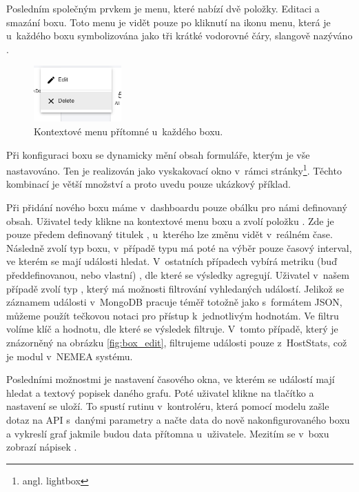Posledním společným prvkem je menu, které nabízí dvě položky. Editaci a smazání boxu. Toto menu je vidět pouze po kliknutí na ikonu menu, která je u~každého boxu symbolizována jako tři krátké vodorovné čáry, slangově nazýváno .

\begin{figure}[ht]
    \centering
    \includegraphics[width=0.3\textwidth]{fig/box_menu.png}
    \caption{Kontextové menu přítomné u~každého boxu.} \label{fig:box_menu}
\end{figure}

Při konfiguraci boxu se dynamicky mění obsah formuláře, kterým je vše nastavováno. Ten je realizován jako vyskakovací okno v~rámci stránky\footnote{angl. lightbox}. Těchto kombinací je větší množství a proto uvedu pouze ukázkový příklad.

Při přidání nového boxu máme v~dashboardu pouze obálku pro námi definovaný obsah. Uživatel tedy klikne na kontextové menu boxu a zvolí položku . Zde je pouze předem definovaný titulek , u~kterého lze změnu vidět v~reálném čase. Následně zvolí typ boxu, v~případě typu  má poté na výběr pouze časový interval, ve kterém se mají události hledat. V~ostatních případech vybírá metriku (buď předdefinovanou, nebo vlastní) , dle které se výsledky agregují. Uživatel v~našem případě zvolí typ , který má možnosti filtrování vyhledaných událostí. Jelikož se záznamem události v~MongoDB pracuje téměř totožně jako s~formátem JSON, můžeme použít tečkovou notaci pro přístup k~jednotlivým hodnotám. Ve filtru volíme klíč a hodnotu, dle které se výsledek filtruje. V~tomto případě, který je znázorněný na obrázku \ref{fig:box_edit}, filtrujeme události pouze z~HostStats, což je modul v~NEMEA systému.

Posledními možnostmi je nastavení časového okna, ve kterém se událostí mají hledat a textový popisek daného grafu. Poté uživatel klikne na tlačítko  a nastavení se uloží. To spustí rutinu v~kontroléru, která pomocí modelu zašle dotaz na API s~danými parametry a načte data do nově nakonfigurovaného boxu a vykreslí graf jakmile budou data přítomna u~uživatele. Mezitím se v~boxu zobrazí nápisek .


